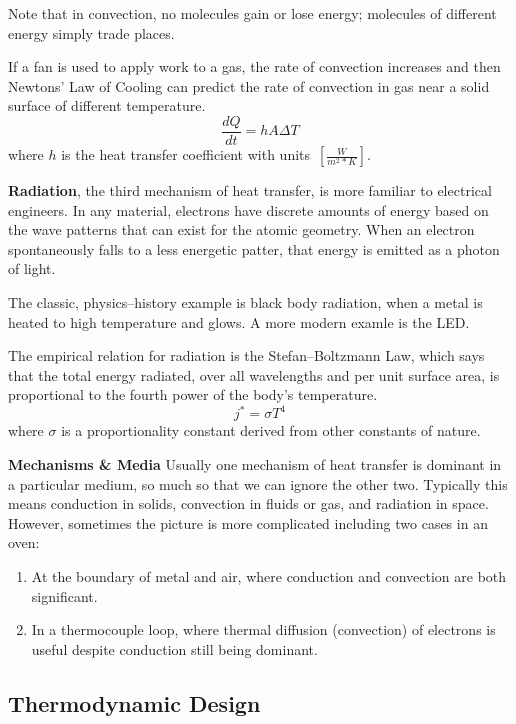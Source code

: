 \documentclass[10pt, twocolumn]{article}
\begin{document}
Note that in convection, no molecules gain or lose energy;
molecules of different energy simply trade places.

If a fan is used to apply work to a gas, the rate of convection
increases and then Newtons' Law of Cooling can predict the
rate of convection in gas near a solid surface of different
temperature.
\begin{equation}
\frac{dQ}{dt}=hA\Delta T
\label{newtons-cooling-law}
\end{equation}
where \(h\) is the heat transfer coefficient with \mbox{units \(\left[\frac{W}{m^{2}*K}\right]\)}.

\textbf{Radiation}, the third mechanism of heat transfer, is more
familiar to electrical engineers. In any material, electrons
have discrete amounts of energy based on the wave patterns that can
exist for the atomic geometry. When an electron spontaneously falls
to a less energetic patter, that energy is emitted as a photon of
light.

The classic, physics--history example is black body radiation,
when a metal is heated to high temperature and glows.
A more modern examle is the LED.

The empirical relation for radiation is the Stefan--Boltzmann Law,
which says that the total energy radiated, over all wavelengths
and per unit surface area, is proportional to the fourth power of
the body's temperature.
\begin{equation}
j^{*}=\sigma T^{4}
\end{equation}
where $\sigma$ is a proportionality constant derived from other
constants of nature.

\textbf{Mechanisms \& Media} Usually one mechanism of heat transfer
is dominant in a particular medium, so much so that we can ignore the
other two. Typically this means conduction in solids,
convection in fluids or gas, and radiation in space.
However, sometimes the picture is more complicated including
two cases in an oven:
\begin{enumerate}
	\item At the boundary of metal and air, where conduction
	and convection are both significant.
	\item In a thermocouple loop, where thermal diffusion (convection)
	of electrons is useful despite conduction still being dominant.
\end{enumerate}

\subsection{Thermodynamic Design}
\end{document}
